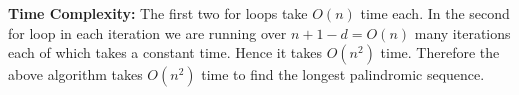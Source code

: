 \documentclass[a4paper, 11pt]{article}
\begin{document}
{\begin{algorithm}
{

}
\caption{$(S)$}
\end{algorithm}\parinf

\textbf{Time Complexity:} The first two for loops take $O(n)$ time each. In the second for loop in each iteration we are running over $n+1-d=O(n)$ many iterations each of which takes a constant time. Hence it takes $O(n^2)$ time. Therefore the above algorithm takes $O(n^2)$ time to find the longest palindromic sequence. 
}


\end{document}
